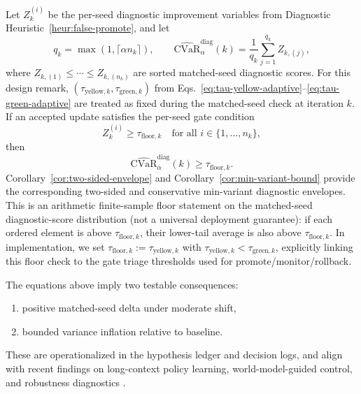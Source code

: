 \documentclass[letterpaper,10pt,conference]{ieeeconf}
\begin{document}
Let $Z_k^{(i)}$ be the per-seed diagnostic improvement variables from Diagnostic Heuristic~\ref{heur:false-promote}, and let
\[
q_k=\max(1,\lceil \alpha n_k\rceil),\qquad
\widehat{\mathrm{CVaR}}_{\alpha}^{\mathrm{diag}}(k)=\frac{1}{q_k}\sum_{j=1}^{q_k} Z_{k,(j)},
\]
where $Z_{k,(1)}\le \cdots \le Z_{k,(n_k)}$ are sorted matched-seed diagnostic scores.
For this design remark, $(\tau_{\text{yellow},k},\tau_{\text{green},k})$ from Eqs.~\ref{eq:tau-yellow-adaptive}--\ref{eq:tau-green-adaptive} are treated as fixed during the matched-seed check at iteration $k$.
If an accepted update satisfies the per-seed gate condition
\[
Z_k^{(i)}\ge \tau_{\mathrm{floor},k}\quad \text{for all } i\in\{1,\dots,n_k\},
\]
then
\[
\widehat{\mathrm{CVaR}}_{\alpha}^{\mathrm{diag}}(k)\ge \tau_{\mathrm{floor},k}.
\]
Corollary~\ref{cor:two-sided-envelope} and Corollary~\ref{cor:min-variant-bound} provide the corresponding two-sided and conservative min-variant diagnostic envelopes. This is an arithmetic finite-sample floor statement on the matched-seed diagnostic-score distribution (not a universal deployment guarantee): if each ordered element is above $\tau_{\mathrm{floor},k}$, their lower-tail average is also above $\tau_{\mathrm{floor},k}$. In implementation, we set $\tau_{\mathrm{floor},k}:=\tau_{\text{yellow},k}$ with $\tau_{\text{yellow},k}<\tau_{\text{green},k}$, explicitly linking this floor check to the gate triage thresholds used for promote/monitor/rollback.

The equations above imply two testable consequences:
\begin{enumerate}
\item positive matched-seed delta under moderate shift,
\item bounded variance inflation relative to baseline.
\end{enumerate}
These are operationalized in the hypothesis ledger and decision logs, and align with recent findings on long-context policy learning, world-model-guided control, and robustness diagnostics \cite{a2602_15010v1,a2602_10983v2,a2602_06556v1,a2602_12032v1,a2602_09021v1}.
\end{document}
